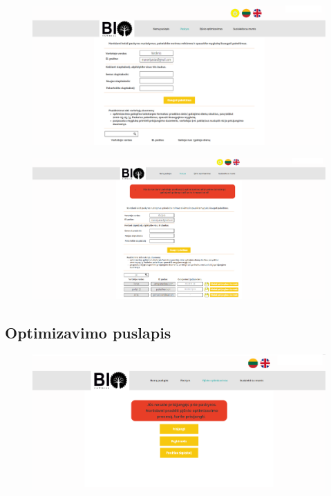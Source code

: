 \documentclass[a4paper,12pt]{article}
\begin{document}
\begin{figure}[!tph]
\hspace{-3cm}
\centering
\includegraphics[scale=0.5]{interfeisai/paskyrosPuslapisAdministratorius}
\label{fig:verticalcell}
\end{figure}

\clearpage

\begin{figure}[!tph]
\hspace{-3cm}
\centering
\includegraphics[scale=0.5]{interfeisai/paskyrosPuslapisAdministratoriusSuKlaida}
\label{fig:verticalcell}
\end{figure}



\clearpage

\subsection{Optimizavimo puslapis}
\begin{figure}[!tph]
\hspace{-3cm}
\centering
\includegraphics[scale=0.5]{interfeisai/optimizavimoPuslapisNeprisijungus}
\label{fig:verticalcell}
\end{figure}
\end{document}

